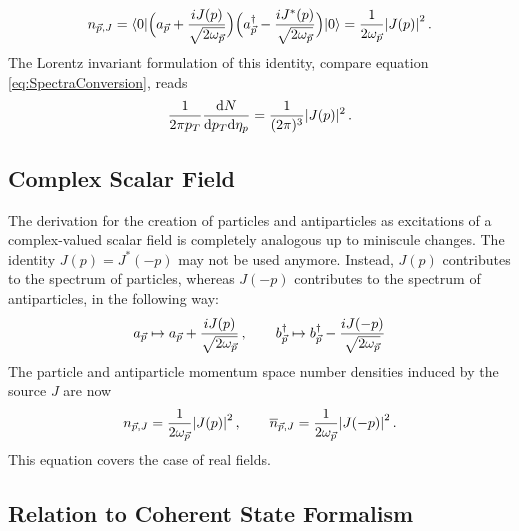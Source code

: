 \begin{equation}
    n_{\vec{p},J}={\langle0\rvert}\Big(a_{\vec{p}}+\frac{{i} J(p)}{\sqrt{2\omega_{\vec{p}}}}\Big)\Big(a_{\vec{p}}^\dagger-\frac{{i} J^*(p)}{\sqrt{2\omega_{\vec{p}}}}\Big){\lvert0\rangle}=\frac{1}{2\omega_{\vec{p}}}{\vert J(p)\vert}^2\,.
\end{equation}
The Lorentz invariant formulation of this identity, compare equation \eqref{eq:SpectraConversion}, reads
\begin{equation}
    \frac{1}{2\pi p_T}\frac{\text{d} N}{\text{d} p_T\text{d}\eta_p}=\frac{1}{(2\pi)^3}\vert J(p)\vert^2\,.
\end{equation}

\subsection{Complex Scalar Field}

The derivation for the creation of particles and antiparticles as excitations of a complex-valued scalar field is completely analogous up to miniscule changes. The identity ${J(p)=J^*(-p)}$ may not be used anymore. Instead, $J(p)$ contributes to the spectrum of particles, whereas $J(-p)$ contributes to the spectrum of antiparticles, in the following way:
\begin{equation}
    a_{\vec{p}}\mapsto a_{\vec{p}}+\frac{{i} J(p)}{\sqrt{2\omega_{\vec{p}}}}\,,\qquad b_{\vec{p}}^\dagger\mapsto b_{\vec{p}}^\dagger-\frac{{i} J(-p)}{\sqrt{2\omega_{\vec{p}}}}
\end{equation}
The particle and antiparticle momentum space number densities induced by the source $J$ are now
\begin{equation}
    n_{\vec{p},J}=\frac{1}{2\omega_{\vec{p}}}{\vert J(p)\vert}^2\,,\qquad \overline{n}_{\vec{p},J}=\frac{1}{2\omega_{\vec{p}}}{\vert J(-p)\vert}^2\,.
    \label{eq:SpectraFromSource}
\end{equation}
This equation covers the case of real fields.


\subsection{Relation to Coherent State Formalism}

